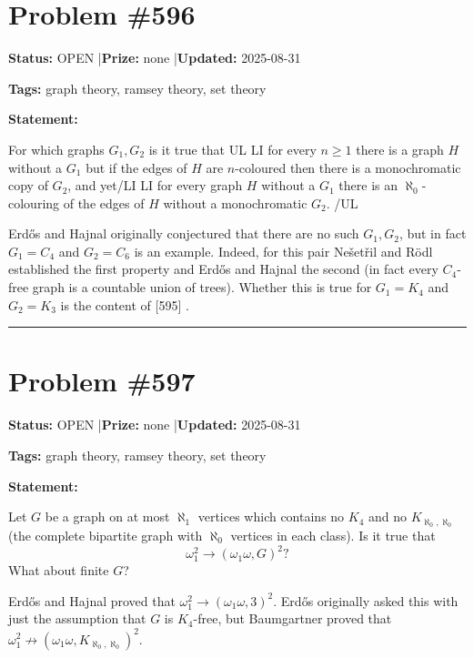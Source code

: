 \documentclass{article}
\begin{document}
\section{Problem \#596}
\label{prob:596}

\noindent\textbf{Status:} OPEN \quad|\quad \textbf{Prize:} none \quad|\quad \textbf{Updated:} 2025-08-31

\noindent\textbf{Tags:} graph theory, ramsey theory, set theory

\medskip

\noindent\textbf{Statement:}

For which graphs $G_1,G_2$ is it true that {UL} {LI} for every $n\geq 1$ there is a graph $H$ without a $G_1$ but if the edges of $H$ are $n$-coloured then there is a monochromatic copy of $G_2$, and yet{/LI} {LI} for every graph $H$ without a $G_1$ there is an $\aleph_0$-colouring of the edges of $H$ without a monochromatic $G_2$. {/UL}




Erd\H{o}s and Hajnal originally conjectured that there are no such $G_1,G_2$, but in fact $G_1=C_4$ and $G_2=C_6$ is an example. Indeed, for this pair Ne\v{s}et\v{r}il and R\"{o}dl established the first property and Erd\H{o}s and Hajnal the second (in fact every $C_4$-free graph is a countable union of trees). Whether this is true for $G_1=K_4$ and $G_2=K_3$ is the content of [595] .

\noindent\rule{\linewidth}{0.4pt}


\section{Problem \#597}
\label{prob:597}

\noindent\textbf{Status:} OPEN \quad|\quad \textbf{Prize:} none \quad|\quad \textbf{Updated:} 2025-08-31

\noindent\textbf{Tags:} graph theory, ramsey theory, set theory

\medskip

\noindent\textbf{Statement:}

Let $G$ be a graph on at most $\aleph_1$ vertices which contains no $K_4$ and no $K_{\aleph_0,\aleph_0}$ (the complete bipartite graph with $\aleph_0$ vertices in each class). Is it true that\[\omega_1^2 \to (\omega_1\omega, G)^2?\]What about finite $G$?




Erd\H{o}s and Hajnal proved that $\omega_1^2 \to (\omega_1\omega,3)^2$. Erd\H{o}s originally asked this with just the assumption that $G$ is $K_4$-free, but Baumgartner proved that $\omega_1^2 \not\to (\omega_1\omega, K_{\aleph_0,\aleph_0})^2$.
\end{document}
